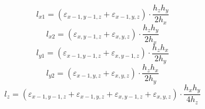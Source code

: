 \documentclass[12pt]{article}
\begin{document}
\begin{displaymath}
l_{x1}=(\varepsilon_{x-1,y-1,z}+\varepsilon_{x-1,y,z})\cdot \frac{h_{z}h_{y}}{2h_{x}}
\end{displaymath}
\begin{displaymath}
l_{x2}=(\varepsilon_{x,y-1,z}+\varepsilon_{x,y,z})\cdot \frac{h_{z}h_{y}}{2h_{x}}
\end{displaymath}
\begin{displaymath}
l_{y1}=(\varepsilon_{x-1,y-1,z}+\varepsilon_{x,y-1,z})\cdot \frac{h_{z}h_{x}}{2h_{y}}
\end{displaymath}
\begin{displaymath}
l_{y2}=(\varepsilon_{x-1,y,z}+\varepsilon_{x,y,z})\cdot \frac{h_{z}h_{x}}{2h_{y}}
\end{displaymath}
\begin{displaymath}
l_{z}=(\varepsilon_{x-1,y-1,z}+\varepsilon_{x-1,y,z}+\varepsilon_{x,y-1,z}+\varepsilon_{x,y,z})\cdot \frac{h_{x}h_{y}}{4h_{z}}
\end{displaymath}
\end{document}
